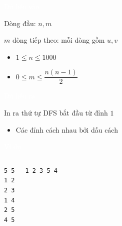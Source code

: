 \documentclass{beamer}
\newcommand{\hlwhite}[1]{\textcolor{white}{#1}}
\begin{document}

\begin{frame}{\hlwhite{Dữ liệu vào}}
\begin{tcolorbox}[title=\textbf{\hlwhite{Input}}]
Dòng đầu: $n, m$

$m$ dòng tiếp theo: mỗi dòng gồm $u, v$
\end{tcolorbox}

\begin{itemize}
\item $1 \le n \le 1000$
\item $0 \le m \le \dfrac{n(n-1)}{2}$
\end{itemize}
\end{frame}


\begin{frame}{\hlwhite{Dữ liệu ra}}
\begin{tcolorbox}[title=\textbf{\hlwhite{Output}}]
In ra thứ tự DFS bắt đầu từ đỉnh $1$
\end{tcolorbox}

\begin{itemize}
\item Các đỉnh cách nhau bởi dấu cách
\end{itemize}
\end{frame}


\begin{frame}[fragile]{\hlwhite{Ví dụ}}
\begin{columns}

\begin{tcolorbox}[title=\textbf{Input}]
\begin{lstlisting}
5 5
1 2
2 3
1 4
2 5
4 5
\end{lstlisting}
\end{tcolorbox}

\begin{tcolorbox}[title=\textbf{Output}]
\begin{lstlisting}
1 2 3 5 4
\end{lstlisting}
\end{tcolorbox}

\end{columns}
\end{frame}

\end{document}

